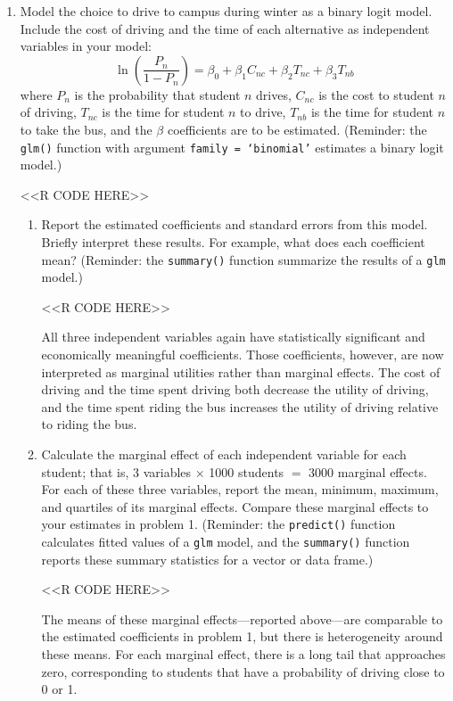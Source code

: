 \documentclass[11pt,letterpaper]{article}
\begin{document}
\begin{enumerate}[label=\alph*., leftmargin=*]
	\item Model the choice to drive to campus during winter as a binary logit model. Include the cost of driving and the time of each alternative as independent variables in your model:
	$$\ln \left( \frac{P_n}{1 - P_n} \right) = \beta_0 + \beta_1 C_{nc} + \beta_2 T_{nc} + \beta_3 T_{nb}$$
	where $P_n$ is the probability that student $n$ drives, $C_{nc}$ is the cost to student $n$ of driving, $T_{nc}$ is the time for student $n$ to drive, $T_{nb}$ is the time for student $n$ to take the bus, and the $\beta$ coefficients are to be estimated. (Reminder: the \texttt{glm()} function with argument \texttt{family = `binomial'} estimates a binary logit model.)

	<<R CODE HERE>>

	\begin{enumerate}[label=\roman*.]
		\item Report the estimated coefficients and standard errors from this model. Briefly interpret these results. For example, what does each coefficient mean? (Reminder: the \texttt{summary()} function summarize the results of a \texttt{glm} model.)

		<<R CODE HERE>>

		All three independent variables again have statistically significant and economically meaningful coefficients. Those coefficients, however, are now interpreted as marginal utilities rather than marginal effects. The cost of driving and the time spent driving both decrease the utility of driving, and the time spent riding the bus increases the utility of driving relative to riding the bus.

		\item Calculate the marginal effect of each independent variable for each student; that is, 3 variables $\times$ 1000 students $=$ 3000 marginal effects. For each of these three variables, report the mean, minimum, maximum, and quartiles of its marginal effects. Compare these marginal effects to your estimates in problem 1. (Reminder: the \texttt{predict()} function calculates fitted values of a \texttt{glm} model, and the \texttt{summary()} function reports these summary statistics for a vector or data frame.)

		<<R CODE HERE>>

		The means of these marginal effects---reported above---are comparable to the estimated coefficients in problem 1, but there is heterogeneity around these means. For each marginal effect, there is a long tail that approaches zero, corresponding to students that have a probability of driving close to 0 or 1.


\end{enumerate}
\end{enumerate}
\end{document}
